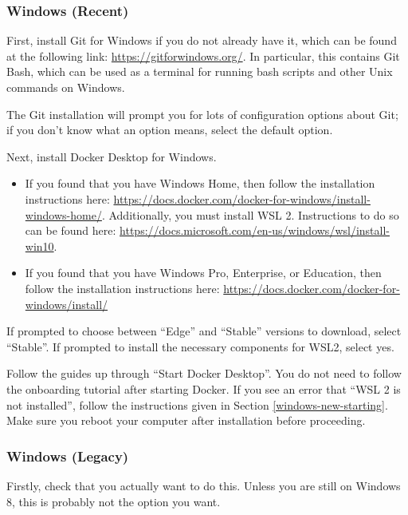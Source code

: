 \subsubsection{Windows (Recent)}\label{windows-new}

First, install Git for Windows if you do not already have it, which can be found at the following link:
\url{https://gitforwindows.org/}. In particular, this contains Git Bash, which can be used as a terminal for running bash scripts and other Unix commands on Windows.

The Git installation will prompt you for lots of configuration options about Git; if you don't know what an option means, select the default option.

Next, install Docker Desktop for Windows.

\begin{itemize}
    \item If you found that you have Windows Home, then follow the installation instructions here: \url{https://docs.docker.com/docker-for-windows/install-windows-home/}.
    Additionally, you must install WSL 2. Instructions to do so can be found here: \href{https://docs.microsoft.com/en-us/windows/wsl/install-win10#step-1---enable-the-windows-subsystem-for-linux}{https://docs.microsoft.com/en-us/windows/wsl/install-win10}.

    \item If you found that you have Windows Pro, Enterprise, or Education, then follow the installation instructions here: \url{https://docs.docker.com/docker-for-windows/install/}
\end{itemize}

If prompted to choose between ``Edge'' and ``Stable'' versions to download, select ``Stable''. If prompted to install the necessary components for WSL2, select yes.

Follow the guides up through ``Start Docker Desktop''. You do not need to follow the onboarding tutorial after starting Docker. If you see an error that ``WSL 2 is not installed'', follow the instructions given in Section \ref{windows-new-starting}. Make sure you reboot your computer after installation before proceeding.

\subsubsection{Windows (Legacy)}\label{windows-old}

Firstly, check that you actually want to do this. Unless you are still on Windows 8, this is probably not the option you want.

